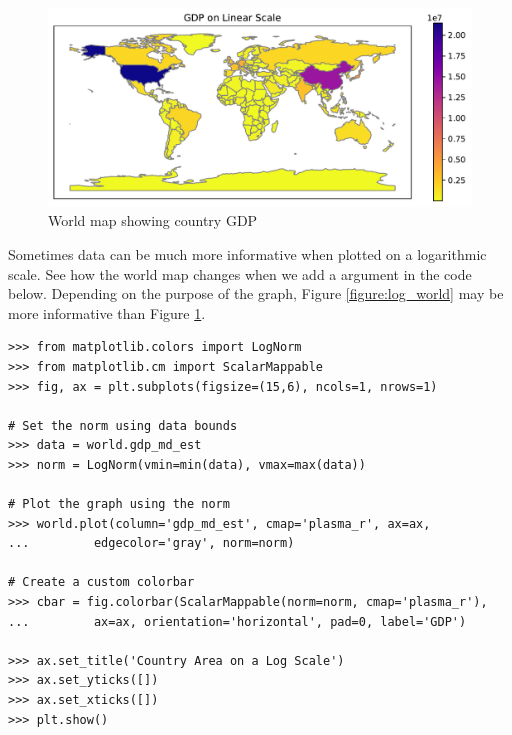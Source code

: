 \begin{figure}[H]
\begin{center}
\includegraphics[scale=.75]{figures/world_linear.pdf}
\end{center}
\caption{World map showing country GDP}
\label{figure:linear_world}
\end{figure}

Sometimes data can be much more informative when plotted on a logarithmic scale.
See how the world map changes when we add a  argument in the code below.
Depending on the purpose of the graph, Figure \ref{figure:log_world} may be more informative than Figure \ref{figure:linear_world}.

\begin{lstlisting}
>>> from matplotlib.colors import LogNorm
>>> from matplotlib.cm import ScalarMappable
>>> fig, ax = plt.subplots(figsize=(15,6), ncols=1, nrows=1)

# Set the norm using data bounds
>>> data = world.gdp_md_est
>>> norm = LogNorm(vmin=min(data), vmax=max(data))

# Plot the graph using the norm
>>> world.plot(column='gdp_md_est', cmap='plasma_r', ax=ax,
...			edgecolor='gray', norm=norm)

# Create a custom colorbar
>>> cbar = fig.colorbar(ScalarMappable(norm=norm, cmap='plasma_r'),
...			ax=ax, orientation='horizontal', pad=0, label='GDP')

>>> ax.set_title('Country Area on a Log Scale')
>>> ax.set_yticks([])
>>> ax.set_xticks([])
>>> plt.show()
\end{lstlisting}

